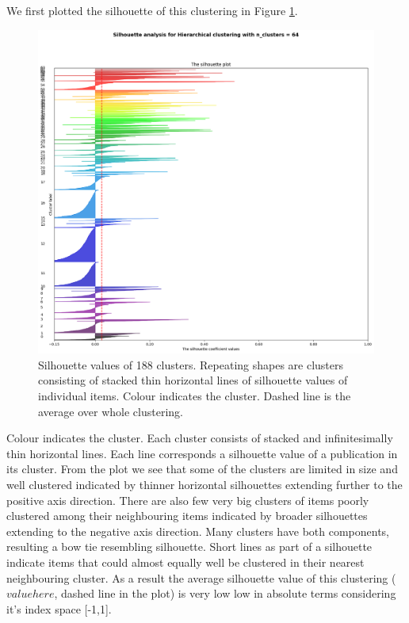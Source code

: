We first plotted the silhouette of this clustering in Figure 
\ref{fig:silh01}.
\begin{figure}[htp]
  \begin{center}    
\includegraphics[width=13cm]{images/6000-64-400-Hierarchical-silhouette-plot.png}
    \caption{Silhouette values of 188 clusters. Repeating shapes
    are clusters consisting of stacked thin horizontal lines of 
    silhouette values of individual items. Colour indicates the 
    cluster.
    Dashed line is the average over whole clustering.}
    \label{fig:silh01}
  \end{center}
\end{figure}
Colour indicates the cluster. Each cluster consists of stacked and 
infinitesimally thin horizontal lines. Each line corresponds a
silhouette value of a publication in its cluster. 
From the plot we see that some of the clusters are limited in size
and well clustered indicated by thinner horizontal silhouettes
extending further to the positive axis direction. There are also 
few very big clusters
of items poorly clustered among their neighbouring items indicated 
by broader silhouettes extending to the negative axis direction. Many clusters
have both components, resulting a bow tie resembling silhouette. 
Short lines as part of a silhouette indicate items that could 
almost equally well be clustered in their nearest neighbouring cluster.
As a result the average silhouette value of this clustering 
($value here$, dashed line in the plot) is 
very low low in absolute terms considering it's index space [-1,1].


